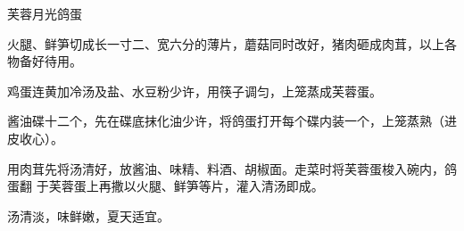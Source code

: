 \begin{recipe}{芙蓉月光鸽蛋}

\ingredients


\preparation

\step 火腿、鲜笋切成长一寸二、宽六分的薄片，蘑菇同时改好，猪肉砸成肉茸，以上各
物备好待用。

\step 鸡蛋连黄加冷汤及盐、水豆粉少许，用筷子调匀，上笼蒸成芙蓉蛋。

\step 酱油碟十二个，先在碟底抹化油少许，将鸽蛋打开每个碟内装一个，上笼蒸熟（进
皮收心）。

\step 用肉茸先将汤清好，放酱油、味精、料酒、胡椒面。走菜时将芙蓉蛋梭入碗内，鸽
蛋翻 于芙蓉蛋上再撒以火腿、鲜笋等片，灌入清汤即成。

\features

汤清淡，味鲜嫩，夏天适宜。

\end{recipe}

